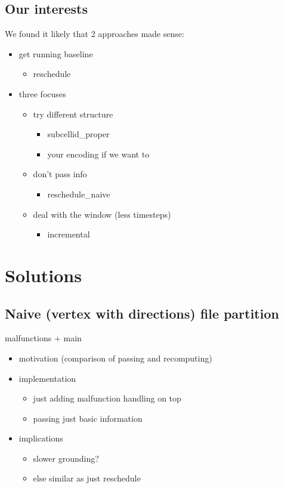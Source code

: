 \documentclass{llncs}
\begin{document}
\subsection{Our interests}
We found it likely that 2 approaches made sense:
\color{green}
\begin{itemize}
	\item get running baseline 
	\begin{itemize}
		\item reschedule
	\end{itemize}
	\item three focuses
	\begin{itemize}
		\item try different structure
		\begin{itemize}
			\item subcellid\_proper
			\item your encoding if we want to
		\end{itemize}
		\item don't pass info
		\begin{itemize}
			\item reschedule\_naive
		\end{itemize}
		\item deal with the window (less timesteps)
		\begin{itemize}
			\item incremental
		\end{itemize}
	\end{itemize}
\end{itemize}
\color{black}


\section{Solutions}

\subsection{Naive (vertex with directions) file partition}
malfunctions + main
\color{blue}
\begin{itemize}
	\item motivation (comparison of passing and recomputing)
	\item implementation
	\begin{itemize}
		\item just adding malfunction handling on top
		\item passing just basic information
	\end{itemize}
	\item implications
	\begin{itemize}
		\item slower grounding?
		\item else similar as just reschedule
	\end{itemize}
\end{itemize}
\color{black}
\end{document}
